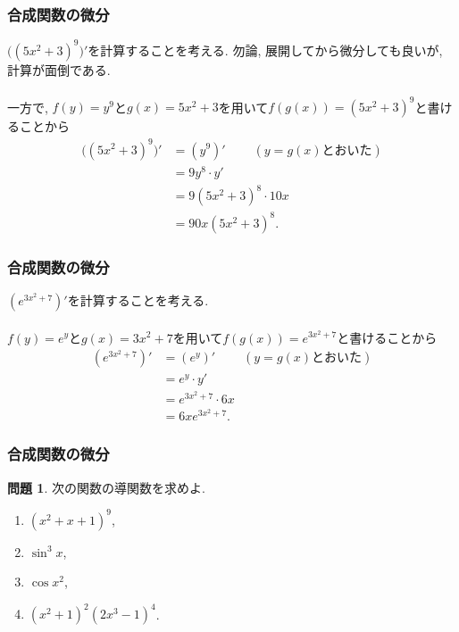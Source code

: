 \documentclass[dvipdfmx,cjk,10.2pt]{beamer}
\theoremstyle{definition}
\newtheorem{Prob}[Thm]{問題}
\begin{document}
\begin{frame}
\frametitle{合成関数の微分}


$\big((5x^2+3)^9\big)'$を計算することを考える. 
勿論, 展開してから微分しても良いが, 計算が面倒である. \\
\ \\

一方で, $f(y)=y^9$と$g(x)=5x^2+3$を用いて$f(g(x))=(5x^2+3)^9$と書けることから
\begin{align*} 
\big((5x^2+3)^9\big)' &= (y^9)'  \ \ \ \ \ \ \ \ \ \ (y=g(x)\text{とおいた})\\
& =9y^8 \cdot y' \\
&=9(5x^2+3)^8 \cdot 10x \\
&= 90x(5x^2+3)^8. 
\end{align*}
\end{frame}





\begin{frame}
\frametitle{合成関数の微分}


$(e^{3x^2+7})'$を計算することを考える. \\
\ \\

$f(y)=e^y$と$g(x)=3x^2+7$を用いて$f(g(x))=e^{3x^2+7}$と書けることから
\begin{align*} 
(e^{3x^2+7})' &= (e^y)'  \ \ \ \ \ \ \ \ \ \ (y=g(x)\text{とおいた})\\
& =e^y \cdot y' \\
&=e^{3x^2+7} \cdot 6x \\
&= 6x e^{3x^2+7}. 
\end{align*}


\end{frame}





\begin{frame}
\frametitle{合成関数の微分}


\begin{Prob}
次の関数の導関数を求めよ. 
\begin{enumerate}
\item $(x^2+x+1)^9$, 
\item $\sin^3 x$, 
\item $\cos x^2$, 
\item $(x^2+1)^2(2x^3-1)^4$. 
\end{enumerate}
\end{Prob}


\end{frame}
\end{document}

